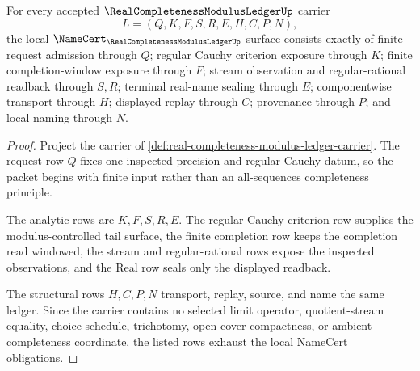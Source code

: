 \begin{theorem}
\label{thm:real-completeness-modulus-ledger-obligations}
For every accepted $\RealCompletenessModulusLedgerUp$ carrier
$$
L=(Q,K,F,S,R,E,H,C,P,N),
$$
the local $\NameCert_{\RealCompletenessModulusLedgerUp}$ surface consists exactly of finite request admission through $Q$; regular Cauchy criterion exposure through $K$; finite completion-window exposure through $F$; stream observation and regular-rational readback through $S,R$; terminal real-name sealing through $E$; componentwise transport through $H$; displayed replay through $C$; provenance through $P$; and local naming through $N$.
\end{theorem}
\begin{proof}
Project the carrier of \autoref{def:real-completeness-modulus-ledger-carrier}. The request row $Q$ fixes one inspected precision and regular Cauchy datum, so the packet begins with finite input rather than an all-sequences completeness principle.

The analytic rows are $K,F,S,R,E$. The regular Cauchy criterion row supplies the modulus-controlled tail surface, the finite completion row keeps the completion read windowed, the stream and regular-rational rows expose the inspected observations, and the Real row seals only the displayed readback.

The structural rows $H,C,P,N$ transport, replay, source, and name the same ledger. Since the carrier contains no selected limit operator, quotient-stream equality, choice schedule, trichotomy, open-cover compactness, or ambient completeness coordinate, the listed rows exhaust the local NameCert obligations.
\end{proof}

